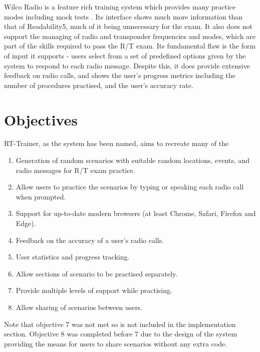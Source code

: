 Wilco Radio is a feature rich training system which provides many practice modes including mock tests \cite{Wilco-Radio}. Its interface shows much more information than that of Readability5, much of it being unnecessary for the exam. It also does not support the managing of radio and transponder frequencies and modes, which are part of the skills required to pass the R/T exam. Its fundamental flaw is the form of input it supports - users select from a set of predefined options given by the system to respond to each radio message. Despite this, it does provide extensive feedback on radio calls, and shows the user's progress metrics including the number of procedures practised, and the user's accuracy rate.

\section{Objectives}

RT-Trainer, as the system has been named, aims to recreate many of the 

\begin{enumerate}
    \item Generation of random scenarios with suitable random locations, events, and radio messages for R/T exam practice.
    \item Allow users to practice the scenarios by typing or speaking each radio call when prompted.
    \item Support for up-to-date modern browsers (at least Chrome, Safari, Firefox and Edge).
    \item Feedback on the accuracy of a user's radio calls.
    \item User statistics and progress tracking.
    \item Allow sections of scenario to be practised separately.
    \item Provide multiple levels of support while practising.
    \item Allow sharing of scenarios between users.
\end{enumerate}

Note that objective 7 was not met so is not included in the implementation section. Objective 8 was completed before 7 due to the design of the system providing the means for users to share scenarios without any extra code.
